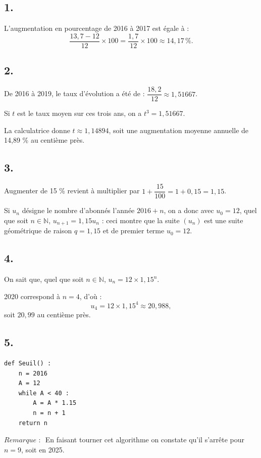 \subsection*{1.}

L'augmentation en pourcentage de 2016 à 2017 est égale à :
\[
\dfrac{13{,}7 - 12}{12} \times 100 = \dfrac{1{,}7}{12} \times 100 \approx 14{,}17 \, \%.
\]

\subsection*{2.}

De 2016 à 2019, le taux d'évolution a été de : \(\dfrac{18{,}2}{12} \approx 1{,}51667\).

Si \( t \) est le taux moyen sur ces trois ans, on a \( t^3 = 1{,}51667 \).

La calculatrice donne \( t \approx 1{,}14894 \), soit une augmentation moyenne annuelle de 14,89 \% au centième près.

\subsection*{3.}

Augmenter de 15 \% revient à multiplier par \( 1 + \dfrac{15}{100} = 1 + 0{,}15 = 1{,}15 \).

Si \( u_n \) désigne le nombre d'abonnés l'année \( 2016 + n \), on a donc avec \( u_0 = 12 \), quel que soit \( n \in \mathbb{N} \), \( u_{n+1} = 1{,}15 u_n \) : ceci montre que la suite \( (u_n) \) est une suite géométrique de raison \(q = 1,15\) et de premier terme \( u_0 = 12 \).

\subsection*{4.}

On sait que, quel que soit \( n \in \mathbb{N} \), \( u_n = 12 \times 1{,}15^n \).

2020 correspond à \( n = 4 \), d'où :
\[
u_4 = 12 \times 1{,}15^4 \approx 20{,}988,
\]
soit \(20{,}99\) au centième près.

\subsection*{5.}

\begin{center}
\begin{lstlisting}[style=python]
def Seuil() :
    n = 2016
    A = 12
    while A < 40 :
        A = A * 1.15
        n = n + 1
    return n
\end{lstlisting}
\end{center}

\(\textit{Remarque : }\) En faisant tourner cet algorithme on constate qu'il s'arrête pour \( n = 9 \), soit en 2025.
